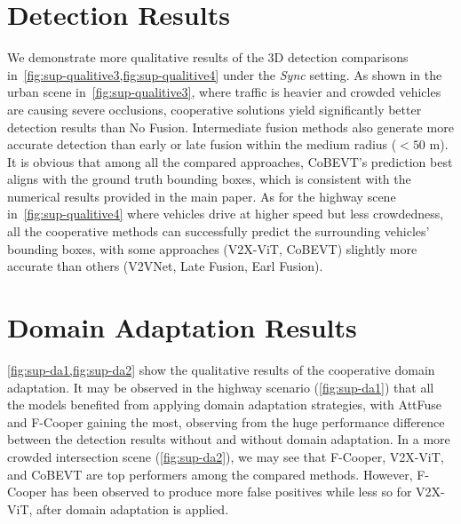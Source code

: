 \documentclass[10pt,twocolumn,letterpaper]{article}
\begin{document}
\section{Detection Results}
\label{sec:sup-detection}

We demonstrate more qualitative results of the 3D detection comparisons in~\cref{fig:sup-qualitive3,fig:sup-qualitive4} under the \textit{Sync} setting. As shown in the urban scene in~\cref{fig:sup-qualitive3}, where traffic is heavier and crowded vehicles are causing severe occlusions, cooperative solutions yield significantly better detection results than No Fusion. Intermediate fusion methods also generate more accurate detection than early or late fusion within the medium radius ($<50$ m). It is obvious that among all the compared approaches, CoBEVT's prediction best aligns with the ground truth bounding boxes, which is consistent with the numerical results provided in the main paper. As for the highway scene in~\cref{fig:sup-qualitive4} where vehicles drive at higher speed but less crowdedness, all the cooperative methods can successfully predict the surrounding vehicles' bounding boxes, with some approaches (V2X-ViT, CoBEVT) slightly more accurate than others (V2VNet, Late Fusion, Earl Fusion).

\section{Domain Adaptation Results}
\label{sec:sup-da}

\cref{fig:sup-da1,fig:sup-da2} show the qualitative results of the cooperative domain adaptation. It may be observed in the highway scenario (\cref{fig:sup-da1}) that all the models benefited from applying domain adaptation strategies, with AttFuse and F-Cooper gaining the most, observing from the huge performance difference between the detection results without and without domain adaptation. In a more crowded intersection scene (\cref{fig:sup-da2}), we may see that F-Cooper, V2X-ViT, and CoBEVT are top performers among the compared methods. However, F-Cooper has been observed to produce more false positives while less so for V2X-ViT, after domain adaptation is applied.


% 
% 
\end{document}

